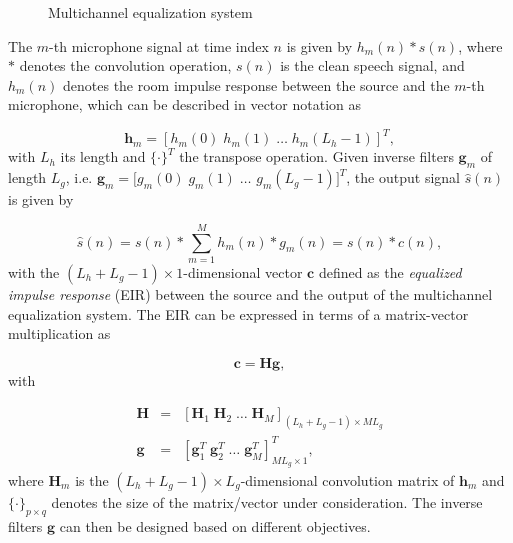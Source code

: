 \documentclass{article}
\begin{document}
\begin{figure}[b]
  \vspace{-.4cm}
  \caption{Multichannel equalization system}
  \label{fig: acsys}
\end{figure}
The $m$-th microphone signal at time index $n$ is given by $h_m(n) \ast s(n)$, where $\ast$ denotes the convolution operation, $s(n)$ is the clean speech signal, and $h_m(n)$ denotes the room impulse response between the source and the $m$-th microphone, which can be described in vector notation as

\begin{equation}
  \mathbf{h}_m = \left[h_m(0) \; h_m(1) \; \ldots \; h_m(L_h-1) \right]^T,
\end{equation}
with $L_h$ its length and $\{\cdot \}^T$ the transpose operation.
Given inverse filters $\mathbf{g}_m$ of length $L_g$, i.e. $\mathbf{g}_m = [g_m(0) \; g_m(1) \; \ldots$ $ g_m(L_g-1)]^T$,
the output signal $\hat{s}(n)$ is given by

\begin{equation}
  \hat{s}(n) = s(n) \ast \sum_{m=1}^{M} h_m(n) \ast g_m(n) = s(n) \ast c(n),
\end{equation}
with the $(L_h+L_g-1) \times 1$-dimensional vector $\mathbf{c}$ defined as the \emph{equalized impulse response} (EIR) between the source and the output of the multichannel equalization system.
The EIR can be expressed in terms of a matrix-vector multiplication as 

\begin{equation}
\mathbf{c} = \mathbf{H} \mathbf{g},
\end{equation}
with 

\begin{eqnarray}
  \mathbf{H} & = & \left[\mathbf{H}_1 \; \mathbf{H}_2 \; \ldots \; \mathbf{H}_M \right]_{(L_h+L_g-1)\times ML_g} \\
  \mathbf{g} & = & \left[\mathbf{g}_1^T \; \mathbf{g}_2^T \; \ldots \; \mathbf{g}_M^T \right]_{ML_g \times 1}^T,
\end{eqnarray}
where $\mathbf{H}_m$ is the $(L_h+L_g-1)\times L_g$-dimensional convolution matrix of $\mathbf{h}_m$ and $\{\cdot\}_{p \times q}$ denotes the size of the matrix/vector under consideration.
The inverse filters $\mathbf{g}$ can then be designed based on different objectives.
\end{document}

